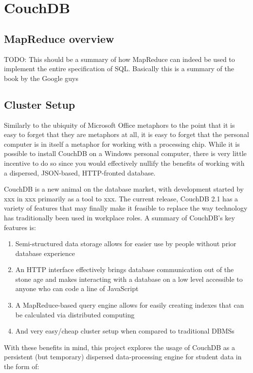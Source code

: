 \section{CouchDB}

\subsection{MapReduce overview}
TODO: This should be a summary of how MapReduce can indeed be used to implement the entire specification of SQL. Basically this is a summary of the book by the Google guys

\subsection{Cluster Setup}
Similarly to the ubiquity of Microsoft Office metaphors to the point that it is easy to forget that they are metaphors at all, it is easy to forget that the personal computer is in itself a metaphor for working with a processing chip. While it is possible to install CouchDB on a Windows personal computer, there is very little incentive to do so since you would effectively nullify the benefits of working with a dispersed, JSON-based, HTTP-fronted database.

CouchDB is a new animal on the database market, with development started by xxx in xxx primarily as a tool to xxx. The current release, CouchDB 2.1 has a variety of features that may finally make it feasible to replace the way technology has traditionally been used in workplace roles. A summary of CouchDB's key features is:

\begin{enumerate}
    \item Semi-structured data storage allows for easier use by people without prior database experience
    \item An HTTP interface effectively brings database communication out of the stone age and makes interacting with a database on a low level accessible to anyone who can code a line of JavaScript
    \item A MapReduce-based query engine allows for easily creating indexes that can be calculated via distributed computing
    \item And very easy/cheap cluster setup when compared to traditional DBMSs
\end{enumerate}

With these benefits in mind, this project explores the usage of CouchDB as a persistent (but temporary) dispersed data-processing engine for student data in the form of:

